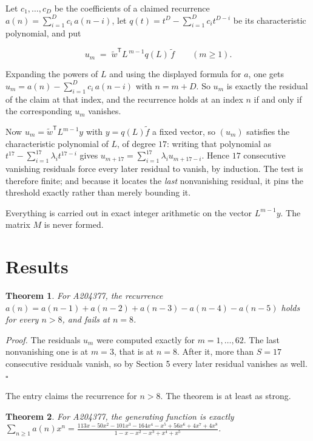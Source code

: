 \documentclass[11pt]{article}
\newtheorem{theorem}{Theorem}
\theoremstyle{definition}
\begin{document}
Let $c_1,\dots,c_D$ be the coefficients of a claimed recurrence $a(n) = \sum_{i=1}^{D} c_i\,a(n-i)$, let $q(t) = t^{D} - \sum_{i=1}^{D} c_i t^{D-i}$ be its characteristic polynomial, and put

\[u_m \;=\; \tilde w^{\mathsf T} L^{\,m-1} q(L)\,\tilde f \qquad (m \ge 1).\]

Expanding the powers of $L$ and using the displayed formula for $a$, one gets $u_m = a(n) - \sum_{i=1}^{D} c_i\,a(n-i)$ with $n = m + D$. So $u_m$ is exactly the residual of the claim at that index, and the recurrence holds at an index $n$ if and only if the corresponding $u_m$ vanishes.

Now $u_m = \tilde w^{\mathsf T} L^{m-1} y$ with $y = q(L)\tilde f$ a fixed vector, so $(u_m)$ satisfies the characteristic polynomial of $L$, of degree $17$: writing that polynomial as $t^{17} - \sum_{i=1}^{17} \lambda_i t^{17-i}$ gives $u_{m+17} = \sum_{i=1}^{17} \lambda_i u_{m+17-i}$. Hence $17$ consecutive vanishing residuals force every later residual to vanish, by induction. The test is therefore finite; and because it locates the {\itshape last} nonvanishing residual, it pins the threshold exactly rather than merely bounding it.

Everything is carried out in exact integer arithmetic on the vector $L^{m-1}y$. The matrix $M$ is never formed.

\section{Results}

\begin{theorem} For A204377, the recurrence $a(n) = a(n-1) + a(n-2) + a(n-3) - a(n-4) - a(n-5)$ holds for every $n > 8$, and fails at $n = 8$.\end{theorem}

{\itshape Proof.} The residuals $u_m$ were computed exactly for $m = 1,\dots,62$. The last nonvanishing one is at $m = 3$, that is at $n = 8$. After it, more than $S = 17$ consecutive residuals vanish, so by Section 5 every later residual vanishes as well. $\square$

The entry claims the recurrence for $n > 8$. The theorem is at least as strong.

\begin{theorem} For A204377, the generating function is exactly $\sum_{n\ge 1} a(n)x^n = \frac{113x - 50x^{2} - 101x^{3} - 164x^{4} - x^{5} + 56x^{6} + 4x^{7} + 4x^{8}}{1 - x - x^{2} - x^{3} + x^{4} + x^{5}}$.\end{theorem}
\end{document}
